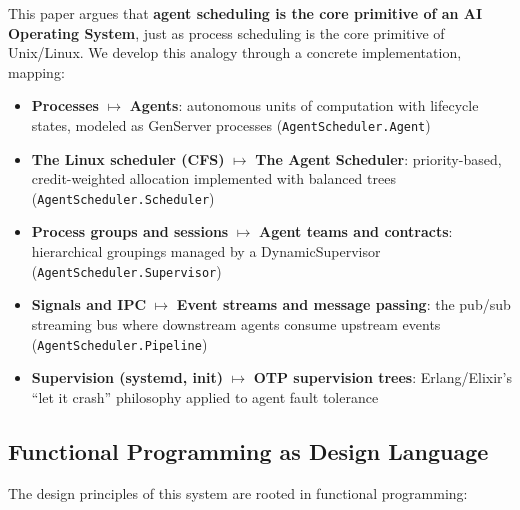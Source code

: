 \documentclass[12pt,a4paper]{article}
\theoremstyle{definition}
\theoremstyle{remark}
\begin{document}
This paper argues that \textbf{agent scheduling is the core primitive of an AI Operating System}, just as process scheduling is the core primitive of Unix/Linux. We develop this analogy through a concrete implementation, mapping:

\begin{itemize}[leftmargin=2em]
  \item \textbf{Processes} $\mapsto$ \textbf{Agents}: autonomous units of computation with lifecycle states, modeled as GenServer processes (\texttt{AgentScheduler.Agent})
  \item \textbf{The Linux scheduler (CFS)} $\mapsto$ \textbf{The Agent Scheduler}: priority-based, credit-weighted allocation implemented with balanced trees (\texttt{AgentScheduler.Scheduler})
  \item \textbf{Process groups and sessions} $\mapsto$ \textbf{Agent teams and contracts}: hierarchical groupings managed by a DynamicSupervisor (\texttt{AgentScheduler.Supervisor})
  \item \textbf{Signals and IPC} $\mapsto$ \textbf{Event streams and message passing}: the pub/sub streaming bus where downstream agents consume upstream events (\texttt{AgentScheduler.Pipeline})
  \item \textbf{Supervision (systemd, init)} $\mapsto$ \textbf{OTP supervision trees}: Erlang/Elixir's ``let it crash'' philosophy applied to agent fault tolerance
\end{itemize}

\subsection{Functional Programming as Design Language}

The design principles of this system are rooted in functional programming:
\end{document}
